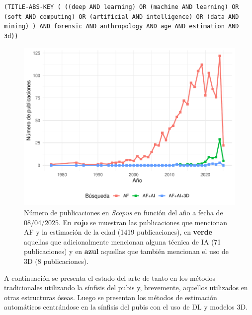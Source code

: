 \begin{lstlisting}[caption={Cadena de búsqueda de \textit{Scopus} para obtener publicaciones de AF que referencian la estimación de la edad, hacen uso de alguna técnica de IA y utilizan datos 3D.}, captionpos=b, label=code__scopus_af_ai_3d, style=Consola]
(TITLE-ABS-KEY ( ((deep AND learning) OR (machine AND learning) OR (soft AND computing) OR (artificial AND intelligence) OR (data AND mining) ) AND forensic AND anthropology AND age AND estimation AND 3d))
\end{lstlisting}

\begin{figure}[h]
    \centering
    \includegraphics[width=\linewidth]{figures/3_sota/scopus_pubs.pdf}
    \caption[Publicaciones por año de AF, AF+IA y AF+IA+3D en Scopus]{Número de publicaciones en \textit{Scopus} en función del año a fecha de 08/04/2025. En {\color{Red} \textbf{rojo}} se muestran las publicaciones que mencionan AF y la estimación de la edad (1419 publicaciones), en {\color{LimeGreen} \textbf{verde}} aquellas que adicionalmente mencionan alguna técnica de IA (71 publicaciones) y en {\color{Blue} \textbf{azul}} aquellas que también mencionan el uso de 3D (8 publicaciones).}
    \label{fig:scopusData}
\end{figure}

A continuación se presenta el estado del arte de tanto en los métodos tradicionales utilizando la sínfisis del pubis y, brevemente, aquellos utilizados en otras estructuras óseas. Luego se presentan los métodos de estimación automáticos centrándose en la sínfisis del pubis con el uso de DL y modelos 3D.

